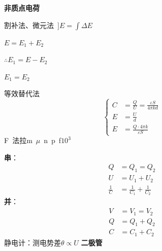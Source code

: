 \textbf{非质点电荷}

割补法、微元法\ $\rbrack$\quad $E=\int\Delta E$

$E=E_1+E_2$

$\therefore E_1=E-E_2$

$E_1=E_2$

等效替代法
\[
\left\{\begin{aligned}
C&=\frac{Q}{U}=\frac{\varepsilon S}{4\pi kd}\\
E&=\frac{U}{d}\\
E&=\frac{Q\cdot 4\pi k}{\varepsilon S}
\end{aligned}\right.
\]
F\ 法拉\qquad m\ $\mu$\ n\ p\ f\qquad \textcircled{\scriptsize$10^3$}
\begin{minipage}[t]{0.48\linewidth}
\end{minipage}\hfill
\begin{minipage}[t]{0.48\linewidth}
\end{minipage}

\textbf{串}：
\begin{align*}
Q&=Q_1=Q_2\\
U&=U_1+U_2\\
\frac{1}{C}&=\frac{1}{C_1}+\frac{1}{C_2}
\end{align*}
\textbf{并}：
\begin{align*}
V&=V_1=V_2 %
\\
Q&=Q_1+Q_2\\
C&=C_1+C_2
\end{align*}
静电计：测电势差\quad $\theta\propto U$
\textbf{二极管}

